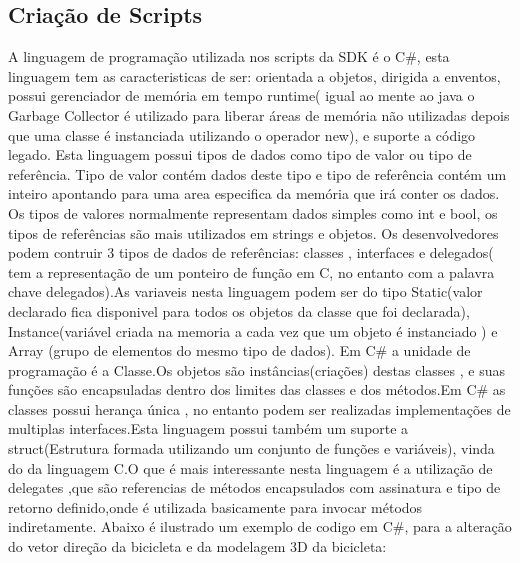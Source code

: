 \subsection{Criação de Scripts}
\label{sub:criacao_de_scripts}
       A linguagem de programação utilizada nos scripts da SDK é o C\#, esta linguagem tem as caracteristicas de ser: orientada a objetos, dirigida a enventos, possui gerenciador de memória em tempo runtime( igual ao mente ao java o Garbage Collector é utilizado para liberar áreas de memória não utilizadas depois que uma classe é instanciada utilizando o operador new), e suporte a código legado.
       Esta linguagem possui tipos de dados como tipo de valor ou tipo de referência. Tipo de valor contém dados deste tipo e tipo de referência contém um inteiro apontando para uma area especifica da memória que irá conter os dados. Os tipos de valores normalmente representam dados simples como int e bool,  os tipos de referências são mais utilizados em strings e objetos. Os desenvolvedores podem contruir 3 tipos de dados de referências: classes , interfaces e delegados( tem a representação de um ponteiro de função em C, no entanto com a palavra chave delegados).As variaveis nesta linguagem podem ser do tipo Static(valor declarado fica disponivel para todos os objetos da classe que foi declarada), Instance(variável criada na memoria a cada vez que um  objeto é instanciado ) e Array (grupo de elementos do mesmo tipo de dados).
      Em C\# a unidade de programação é a Classe.Os objetos são instâncias(criações) destas classes , e suas funções são encapsuladas dentro dos limites  das classes e dos métodos.Em C\# as classes possui herança única , no entanto podem ser realizadas implementações de multiplas interfaces.Esta linguagem possui também um suporte a struct(Estrutura formada utilizando um conjunto de funções e variáveis), vinda do da linguagem C.O que é mais interessante nesta linguagem é a utilização de delegates ,que são referencias de métodos encapsulados com assinatura e tipo de retorno definido,onde é utilizada basicamente para invocar métodos indiretamente.
      Abaixo é ilustrado um exemplo de codigo em C\#, para a alteração do vetor direção da bicicleta e da modelagem 3D da bicicleta: 
 
